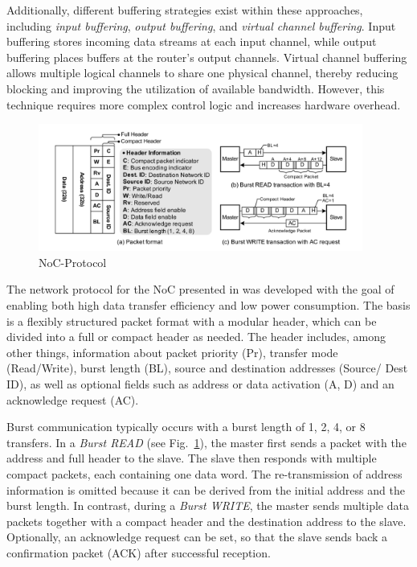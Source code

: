 Additionally, different buffering strategies exist within these approaches, including \textit{input buffering}, \textit{output buffering}, and \textit{virtual channel buffering}. Input buffering stores incoming data streams at each input channel, while output buffering places buffers at the router’s output channels. Virtual channel buffering allows multiple logical channels to share one physical channel, thereby reducing blocking and improving the utilization of available bandwidth. However, this technique requires more complex control logic and increases hardware overhead.\cite{dally_principles_2004}

\begin{figure}[htbp]
    \centering
    \includegraphics[width=0.95\textwidth]{img/NoC Protocol.png}
    \caption{NoC-Protocol~\cite{lee_low-power_2006}}\label{fig:NOC_Protocol}
\end{figure}


The network protocol for the \ac{NoC} presented in \cite{lee_low-power_2006} was developed with the goal of enabling both high data transfer efficiency and low power consumption. The basis is a flexibly structured packet format with a modular header, which can be divided into a full or compact header as needed. The header includes, among other things, information about packet priority (Pr), transfer mode (Read/Write), burst length (BL), source and destination addresses (Source/ Dest ID), as well as optional fields such as address or data activation (A, D) and an acknowledge request (AC).

Burst communication typically occurs with a burst length of 1, 2, 4, or 8 transfers. In a \emph{Burst READ} (see Fig.~\ref{fig:NOC_Protocol}), the master first sends a packet with the address and full header to the slave. The slave then responds with multiple compact packets, each containing one data word. The re-transmission of address information is omitted because it can be derived from the initial address and the burst length. In contrast, during a \emph{Burst WRITE}, the master sends multiple data packets together with a compact header and the destination address to the slave. Optionally, an acknowledge request can be set, so that the slave sends back a confirmation packet (ACK) after successful reception.

